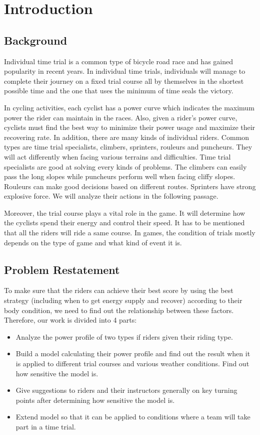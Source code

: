 \documentclass{article}
\begin{document}
	\newpage
	\section{Introduction}
	\subsection{Background}
	Individual time trial is a common type of bicycle road race and has gained popularity in recent years. In individual time trials, individuals will manage to complete their journey on a fixed trial course all by themselves in the shortest possible time and the one that uses the minimum of time seals the victory.

	In cycling activities, each cyclist has a power curve which indicates the maximum power the rider can maintain in the races. Also, given a rider's power curve, cyclists must find the best way to minimize their power usage and maximize their recovering rate. In addition, there are many kinds of individual riders. Common types are time trial specialists, climbers, sprinters, rouleurs and puncheurs. They will act differently when facing various terrains and difficulties. Time trial specialists are good at solving every kinds of problems. The climbers can easily pass the long slopes while puncheurs perform well when facing cliffy slopes. Rouleurs can make good decisions based on different routes. Sprinters have strong explosive force. We will analyze their actions in the following passage.

	Moreover, the trial course plays a vital role in the game. It will determine how the cyclists spend their energy and control their speed. It has to be mentioned that all the riders will ride a same course. In games, the condition of trials mostly depends on the type of game and what kind of event it is.
	\subsection{Problem Restatement}
	To make sure that the riders can achieve their best score by using the best strategy (including when to get energy supply and recover) according  to their body condition, we need to find out the relationship between these factors. Therefore, our work is divided into 4 parts:
	\begin{itemize}
		\item  Analyze the power profile of two types if riders given their riding type.
		\item  Build a model calculating their power profile and find out the result when it is applied to different trial courses and various weather conditions. Find out how sensitive the model is.
		\item  Give suggestions to riders and their instructors generally on key turning points after determining how sensitive the model is.
		\item  Extend model so that it can be applied to conditions where a team will take part in a time trial.
	\end{itemize}
\end{document}
